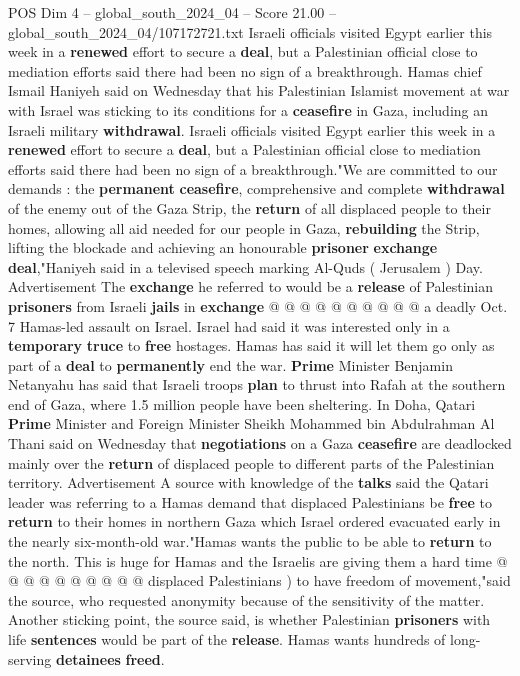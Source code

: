 \begin{textsample}{POS Dim 4 – global\_south\_2024\_04 – Score 21.00 – global\_south\_2024\_04/107172721.txt}  \label{ex:f4_pos_264}
Israeli officials visited Egypt earlier this week in a \textbf{renewed} effort to secure a \textbf{deal}, but a Palestinian official close to mediation efforts said there had been no sign of a breakthrough.
Hamas chief Ismail Haniyeh said on Wednesday that his Palestinian Islamist movement at war with Israel was sticking to its conditions for a \textbf{ceasefire} in Gaza, including an Israeli military \textbf{withdrawal}.
Israeli officials visited Egypt earlier this week in a \textbf{renewed} effort to secure a \textbf{deal}, but a Palestinian official close to mediation efforts said there had been no sign of a breakthrough."We are committed to our demands : the \textbf{permanent} \textbf{ceasefire}, comprehensive and complete \textbf{withdrawal} of the enemy out of the Gaza Strip, the \textbf{return} of all displaced people to their homes, allowing all aid needed for our people in Gaza, \textbf{rebuilding} the Strip, lifting the blockade and achieving an honourable \textbf{prisoner} \textbf{exchange} \textbf{deal},"Haniyeh said in a televised speech marking Al-Quds ( Jerusalem ) Day.
Advertisement The \textbf{exchange} he referred to would be a \textbf{release} of Palestinian \textbf{prisoners} from Israeli \textbf{jails} in \textbf{exchange} @ @ @ @ @ @ @ @ @ @ a deadly Oct. 7 Hamas-led assault on Israel.
Israel had said it was interested only in a \textbf{temporary} \textbf{truce} to \textbf{free} hostages.
Hamas has said it will let them go only as part of a \textbf{deal} to \textbf{permanently} end the war. \textbf{Prime} Minister Benjamin Netanyahu has said that Israeli troops \textbf{plan} to thrust into Rafah at the southern end of Gaza, where 1.5 million people have been sheltering.
In Doha, Qatari \textbf{Prime} Minister and Foreign Minister Sheikh Mohammed bin Abdulrahman Al Thani said on Wednesday that \textbf{negotiations} on a Gaza \textbf{ceasefire} are deadlocked mainly over the \textbf{return} of displaced people to different parts of the Palestinian territory.
Advertisement A source with knowledge of the \textbf{talks} said the Qatari leader was referring to a Hamas demand that displaced Palestinians be \textbf{free} to \textbf{return} to their homes in northern Gaza which Israel ordered evacuated early in the nearly six-month-old war."Hamas wants the public to be able to \textbf{return} to the north.
This is huge for Hamas and the Israelis are giving them a hard time @ @ @ @ @ @ @ @ @ @ displaced Palestinians ) to have freedom of movement,"said the source, who requested anonymity because of the sensitivity of the matter.
Another sticking point, the source said, is whether Palestinian \textbf{prisoners} with life \textbf{sentences} would be part of the \textbf{release}.
Hamas wants hundreds of long-serving \textbf{detainees} \textbf{freed}.

\end{textsample}
